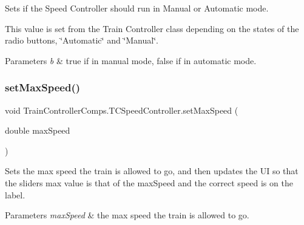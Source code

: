 Sets if the Speed Controller should run in Manual or Automatic mode. 

This value is set from the Train Controller class depending on the states of the radio buttons, \char`\"{}\+Automatic\char`\"{} and \char`\"{}\+Manual\char`\"{}.


\begin{DoxyParams}{Parameters}
{\em b} & true if in manual mode, false if in automatic mode. \\
\hline
\end{DoxyParams}
\mbox{\label{classTrainControllerComps_1_1TCSpeedController_aacfc193db3b550fe02839a55152573cb}} 
\subsubsection{\texorpdfstring{set\+Max\+Speed()}{setMaxSpeed()}}
{\footnotesize\ttfamily void Train\+Controller\+Comps.\+T\+C\+Speed\+Controller.\+set\+Max\+Speed (\begin{DoxyParamCaption}\item[{double}]{max\+Speed }\end{DoxyParamCaption})}



Sets the max speed the train is allowed to go, and then updates the UI so that the slider\textquotesingle{}s max value is that of the max\+Speed and the correct speed is on the label. 


\begin{DoxyParams}{Parameters}
{\em max\+Speed} & the max speed the train is allowed to go. \\
\hline
\end{DoxyParams}
\mbox{\label{classTrainControllerComps_1_1TCSpeedController_aa77cc92612065fb35630dc957e51d131}} 
